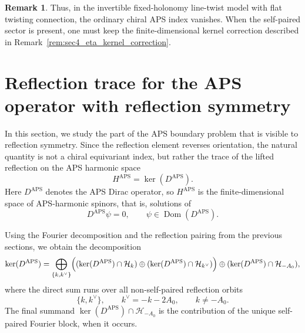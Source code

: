 \documentclass[11pt]{article}
\theoremstyle{definition}
\newtheorem{remark}[remark]{Remark}
\DeclareMathOperator{\APS}{APS}
\DeclareMathOperator{\Dom}{Dom} \newcommand{\Z}{\mathbb{Z}} \DeclareMathOperator{\Ran}{Ran}
\numberwithin{equation}{section}
\begin{document}
\begin{remark}
\label{rem:sec4_index_vs_reflection_trace} 
Thus, in the invertible fixed-holonomy line-twist model with flat twisting connection, the ordinary chiral APS index vanishes. When the self-paired sector is present, one must keep the finite-dimensional kernel correction described in Remark~\ref{rem:sec4_eta_kernel_correction}.
\end{remark}









\section{Reflection trace for the APS operator with reflection symmetry}
\label{sec:APSindex}

In this section, we study the part of the APS boundary problem that is visible to reflection symmetry.
Since the reflection element reverses orientation, the natural quantity is not a chiral equivariant
index, but rather the trace of the lifted reflection on the APS harmonic space
\begin{equation}\label{eq:sec5_APS_harmonic_space}
H^{\APS} = \ker(D^{\APS}).
\end{equation}
Here \(D^{\APS}\) denotes the APS Dirac operator, so \(H^{\APS}\) is the finite-dimensional space of
APS-harmonic spinors, that is, solutions of
\begin{equation}\label{eq:sec5_harmonic_equation}
D^{\APS}\psi = 0,
\qquad
\psi \in \Dom(D^{\APS}).
\end{equation}

Using the Fourier decomposition and the reflection pairing from the previous sections, we obtain
the decomposition
\begin{equation}\label{eq:sec5_kernel_decomposition}
\ker(D^{\APS})
=
\bigoplus_{\{k,k^\vee\}}
\Bigl(
(\ker(D^{\APS}) \cap \mathcal H_k)
\oplus
(\ker(D^{\APS}) \cap \mathcal H_{k^\vee})
\Bigr)
\oplus
(\ker(D^{\APS}) \cap \mathcal H_{-A_0}),
\end{equation}
where the direct sum runs over all non-self-paired reflection orbits
\begin{equation}\label{eq:sec5_orbit_decomposition}
\{k,k^\vee\},
\qquad
k^\vee = -k-2A_0,
\qquad
k \neq -A_0.
\end{equation}
The final summand \(\ker(D^{\APS}) \cap \mathcal H_{-A_0}\) is the contribution of the unique self-paired Fourier block, when it occurs.
\end{document}
